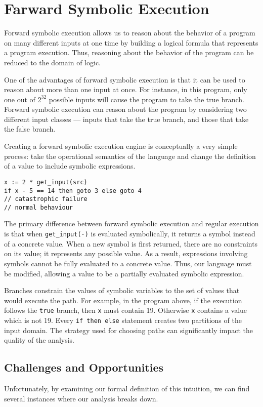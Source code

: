 \section{Farward Symbolic Execution} 
Forward symbolic execution allows us to reason about the behavior of a program on many different inputs at one time by building a logical formula that represents a program execution. Thus, reasoning about the behavior of the program can be reduced to the domain of logic.

One of the advantages of forward symbolic execution is that it can be used to reason about more than one input at once. For instance, in this program, only one out of $2^{32}$ possible inputs will cause the program to take the true branch. Forward symbolic execution can reason about the program by considering two different input classes — inputs that take the true branch, and those that take the false branch.

Creating a forward symbolic execution engine is conceptually a very simple process: take the operational semantics of the language and change the definition of a value to include symbolic expressions.

\begin{lstlisting}
x := 2 * get_input(src)
if x - 5 == 14 then goto 3 else goto 4
// catastrophic failure
// normal behaviour
\end{lstlisting}

The primary difference between forward symbolic execution and regular execution is that when \texttt{get\_input(·)} is evaluated symbolically, it returns a symbol instead of a concrete value. When a new symbol is first returned, there are no constraints on its value; it represents any possible value. As a result, expressions involving symbols cannot be fully evaluated to a concrete value. Thus, our language must be modified, allowing a value to be a partially evaluated symbolic expression.

Branches constrain the values of symbolic variables to the set of values that would execute the path. For example, in the program above, if the execution follows the \texttt{true} branch, then \texttt{x} must contain 19. Otherwise \texttt{x} contains a value which is not 19. Every \texttt{if then else} statement creates two partitions of the input domain. The strategy used for choosing paths can significantly impact the quality of the analysis.

\subsection{Challenges and Opportunities}
Unfortunately, by examining our formal definition of this intuition, we can find several instances where our analysis breaks down. 

